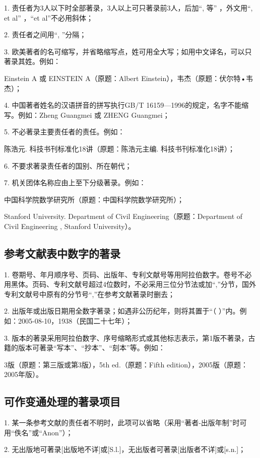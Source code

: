 1. 责任者为3人以下时全部著录，3人以上可只著录前3人，后加“, 等” ，外文用“, et al” ，“et al”不必用斜体；

2. 责任者之间用“, ”分隔；

3. 欧美著者的名可缩写，并省略缩写点，姓可用全大写；如用中文译名，可以只著录其姓。例如：

Einstein  A 或 EINSTEIN  A（原题：Albert Einstein），韦杰（原题：伏尔特•韦杰）；

4. 中国著者姓名的汉语拼音的拼写执行GB/T 16159—1996的规定，名字不能缩写。例如：Zheng  Guangmei 或 ZHENG Guangmei；

5. 不必著录主要责任者的责任。例如：

陈浩元. 科技书刊标准化18讲（原题：陈浩元主编. 科技书刊标准化18讲）；

6. 不要求著录责任者的国别、所在朝代；

7. 机关团体名称应由上至下分级著录。例如：

中国科学院数学研究所（原题：中国科学院数学研究所）；

Stanford University. Department of Civil Engineering（原题：Department of Civil Engineering , Stanford University）。

\subsection{参考文献表中数字的著录}

1. 卷期号、年月顺序号、页码、出版年、专利文献号等用阿拉伯数字。卷号不必用黑体。页码、专利文献号超过4位数时，不必采用三位分节法或加“,”分节，国外专利文献号中原有的分节号“,”在参考文献著录时删去；

2. 出版年或出版日期用全数字著录；如遇非公历纪年，则将其置于“（ ）”内。例如：2005-08-10，1938（民国二十七年）；

3. 版本的著录采用阿拉伯数字、序号缩略形式或其他标志表示，第1版不著录，古籍的版本可著录“写本”、“抄本”、“刻本”等。例如：

3版（原题：第三版或第3版），5th ed.（原题：Fifth edition），2005版（原题：2005年版）。

\subsection{可作变通处理的著录项目}

1. 某一条参考文献的责任者不明时，此项可以省略（采用“著者-出版年制”时可用“佚名”或“Anon”）；

2. 无出版地可著录[出版地不详]或[S.l.]，无出版者可著录[出版者不详]或[s.n.]；

